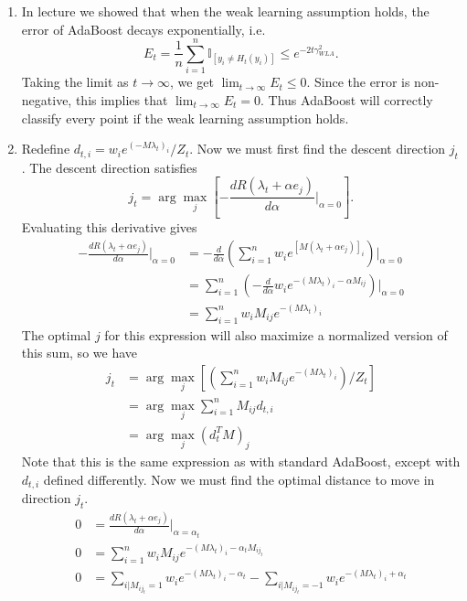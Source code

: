 \documentclass{article}
\begin{document}
		\begin{enumerate}
			\item In lecture we showed that when the weak learning assumption holds, the error of AdaBoost decays exponentially, i.e.
			\[
				E_t = \frac{1}{n} \sum_{i=1}^{n} \mathbb{I}_{[y_i \neq H_t(y_i)]} \leq e^{-2t \gamma_{WLA}^2}.
			\] 
			Taking the limit as $t \to \infty$, we get $\lim_{t \to \infty} E_t \leq 0$. Since the error is non-negative, this implies that $\lim_{t \to \infty} E_t = 0$. Thus AdaBoost will correctly classify every point if the weak learning assumption holds.

		\item 
			Redefine $d_{t,i} = w_i e^{(-M \lambda_t)_i}/Z_t$. Now we must first find the descent direction $j_t$. The descent direction satisfies
		\[
			j_t = \arg\max_j \left[ -\frac{dR(\lambda_t + \alpha e_j)}{d \alpha} \Big|_{\alpha=0} \right].
		\] 
		Evaluating this derivative gives
		\begin{align*}
			-\frac{dR(\lambda_t + \alpha e_j)}{d \alpha} \Big|_{\alpha=0} &= -\frac{d}{d\alpha} \left( \sum_{i=1}^{n} w_i e^{[M(\lambda_t + \alpha e_j)]_i} \right)\Big|_{\alpha=0} \\
										      &= \sum_{i=1}^{n} \left( -\frac{d }{d \alpha} w_i e^{-(M \lambda_t)_i - \alpha M_{ij}} \right) \Big|_{\alpha=0} \\
										      &= \sum_{i=1}^{n} w_i M_{ij}e^{-(M \lambda_t)_i}
		\end{align*}
		The optimal $j$ for this expression will also maximize a normalized version of this sum, so we have
		\begin{align*}
			j_t &= \arg\max_j \left[ \left( \sum_{i=1}^{n} w_i M_{ij}e^{-(M \lambda_t)_i}\right) / Z_t \right] \\
			    &= \arg\max_j \sum_{i=1}^{n} M_{ij} d_{t,i} \\
			    &= \arg\max_j (d_t^T M)_j
		\end{align*}
		Note that this is the same expression as with standard AdaBoost, except with $d_ {t,i}$ defined differently. Now we must find the optimal distance to move in direction $j_t$.
		\begin{align*}
			0 &= \frac{dR(\lambda_t + \alpha e_j)}{d \alpha} \Big|_{\alpha=\alpha_t} \\
			0 &= \sum_{i=1}^{n} w_i M_{ij}e^{-(M\lambda_t)_i - \alpha_t M_{i{j_t}}} \\
			0 &= \sum_{i|M_{i{j_t}}=1} w_i e^{-(M\lambda_t)_i - \alpha_t} - \sum_{i|M_{i{j_t}}=-1} w_i e^{-(M\lambda_t)_i + \alpha_t} \\

\end{align*}
\end{enumerate}
\end{document}
